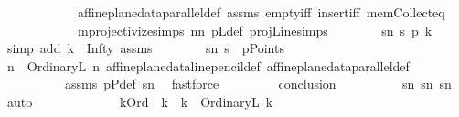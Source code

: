 \begin{isabellebody}
\ \ \ \ \ \ \ \ \ \ \ \ affine{\isacharunderscore}{\kern0pt}plane{\isacharunderscore}{\kern0pt}data{\isachardot}{\kern0pt}parallel{\isacharunderscore}{\kern0pt}def\ assms{\isacharparenleft}{\kern0pt}{}{\isacharparenright}{\kern0pt}\ empty{\isacharunderscore}{\kern0pt}iff\ insert{\isacharunderscore}{\kern0pt}iff\ mem{\isacharunderscore}{\kern0pt}Collect{\isacharunderscore}{\kern0pt}eq\isanewline
\ \ \ \ \ \ \ \ \ \ \ \ mprojectivize{\isachardot}{\kern0pt}simps{\isacharparenleft}{\kern0pt}{}{\isacharparenright}{\kern0pt}\ nn\ pLdef\ projLine{\isachardot}{\kern0pt}simps{\isacharparenleft}{\kern0pt}{}{\isacharparenright}{\kern0pt}{\isacharparenright}{\kern0pt}\isanewline
\ \ \ \ \ \ \isamarkupfalse%
\ sn{}{\isacharcolon}{\kern0pt}\ {\isachardoublequoteopen}{\isacharquery}{\kern0pt}s\ p{\isasymlhd}\ k{\isachardoublequoteclose}\ \ \isamarkupfalse%
\ {\isacharparenleft}{\kern0pt}simp\ add{\isacharcolon}{\kern0pt}\ {\isacartoucheopen}k\ {\isacharequal}{\kern0pt}\ Infty{\isacartoucheclose}\ assms{\isacharparenleft}{\kern0pt}{}{\isacharparenright}{\kern0pt}{\isacharparenright}{\kern0pt}\isanewline
\ \ \ \ \ \ \isamarkupfalse%
\ sn{}{\isacharcolon}{\kern0pt}\ {\isachardoublequoteopen}{\isacharquery}{\kern0pt}s\ {\isasymin}\ pPoints{\isachardoublequoteclose}\ \isanewline
\ \ \ \ \ \ \ \ \isamarkupfalse%
\ {\isacartoucheopen}n\ {\isacharequal}{\kern0pt}\ OrdinaryL\ n{}{\isacartoucheclose}\ affine{\isacharunderscore}{\kern0pt}plane{\isacharunderscore}{\kern0pt}data{\isachardot}{\kern0pt}line{\isacharunderscore}{\kern0pt}pencil{\isacharunderscore}{\kern0pt}def\ affine{\isacharunderscore}{\kern0pt}plane{\isacharunderscore}{\kern0pt}data{\isachardot}{\kern0pt}parallel{\isacharunderscore}{\kern0pt}def\ \isanewline
\ \ \ \ \ \ \ \ \ \ assms{\isacharparenleft}{\kern0pt}{}{\isacharparenright}{\kern0pt}\ pPdef\ sn{}\ \isamarkupfalse%
\ fastforce\ \isanewline
\ \ \ \ \ \ \isamarkupfalse%
\ {\isacharquery}{\kern0pt}conclusion\isanewline
\ \ \ \ \ \ \ \ \isamarkupfalse%
\ sn{}\ sn{}\ sn{}\ \isamarkupfalse%
\ auto\isanewline
\ \ \ \ \isamarkupfalse%
\isanewline
\ \ \isamarkupfalse%
\isanewline
\ \ \ \ \isamarkupfalse%
\ kOrd{\isacharcolon}{\kern0pt}\ {\isachardoublequoteopen}{\isacharparenleft}{\kern0pt}{\isasymexists}\ k{}\ {\isachardot}{\kern0pt}\ k\ {\isacharequal}{\kern0pt}\ OrdinaryL\ k{}{\isacharparenright}{\kern0pt}{\isachardoublequoteclose}\isanewline

\end{isabellebody}
